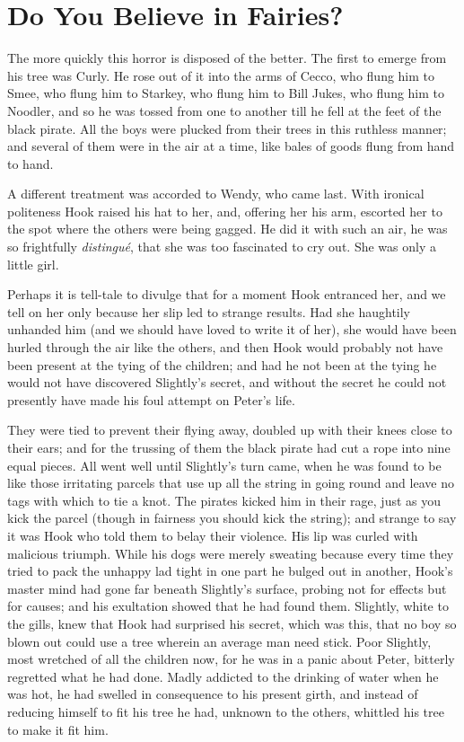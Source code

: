 
\chapter{Do You Believe in Fairies?}

The more quickly this horror is disposed of the better.
The first to emerge from his tree was Curly.
He rose out of it into the arms of Cecco,
who flung him to Smee, who flung him to Starkey, who flung him to Bill Jukes, who flung him to Noodler,
and so he was tossed from one to another till he fell at the feet of the black pirate.
All the boys were plucked from their trees in this ruthless manner;
and several of them were in the air at a time, like bales of goods flung from hand to hand.

A different treatment was accorded to Wendy, who came last.
With ironical politeness Hook raised his hat to her,
and, offering her his arm, escorted her to the spot where the others were being gagged.
He did it with such an air, he was so frightfully \emph{distingué}, that she was too fascinated to cry out.
She was only a little girl.

Perhaps it is tell-tale to divulge that for a moment Hook entranced her,
and we tell on her only because her slip led to strange results.
Had she haughtily unhanded him (and we should have loved to write it of her),
she would have been hurled through the air like the others,
and then Hook would probably not have been present at the tying of the children;
and had he not been at the tying he would not have discovered Slightly’s secret,
and without the secret he could not presently have made his foul attempt on Peter’s life.

They were tied to prevent their flying away, doubled up with their knees close to their ears;
and for the trussing of them the black pirate had cut a rope into nine equal pieces.
All went well until Slightly’s turn came,
when he was found to be like those irritating parcels that use up all the string in going round
and leave no tags with which to tie a knot.
The pirates kicked him in their rage, just as you kick the parcel
(though in fairness you should kick the string);
and strange to say it was Hook who told them to belay their violence.
His lip was curled with malicious triumph.
While his dogs were merely sweating
because every time they tried to pack the unhappy lad tight in one part he bulged out in another,
Hook’s master mind had gone far beneath Slightly’s surface, probing not for effects but for causes;
and his exultation showed that he had found them.
Slightly, white to the gills, knew that Hook had surprised his secret,
which was this, that no boy so blown out could use a tree wherein an average man need stick.
Poor Slightly, most wretched of all the children now, for he was in a panic about Peter,
bitterly regretted what he had done.
Madly addicted to the drinking of water when he was hot,
he had swelled in consequence to his present girth,
and instead of reducing himself to fit his tree he had,
unknown to the others, whittled his tree to make it fit him.

